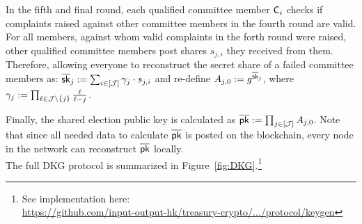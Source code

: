In the fifth and final round, each qualified committee member $\mathsf{C}_i$ checks if complaints raised against other committee members in the fourth round are valid. For all members, against whom valid complaints in the forth round were raised, other qualified committee members post shares $s_{j,i}$ they received from them. Therefore, allowing everyone to reconstruct the secret share of a failed committee members as: $\overline{\mathsf{sk}}_j := \sum_{i\in[\mathcal{J}]} \gamma_{j} \cdot s_{j,i}$ and re-define $A_{j,0}:= g^{\overline{\mathsf{sk}}_j}$, where $\gamma_{j}:= \prod_{\ell\in \mathcal{J}\setminus \{j\} } \frac{\ell}{\ell-j}$. 

Finally, the shared election public key is calculated as $\overline{\mathsf{pk}} := \prod_{j\in[\mathcal{J}]}  A_{j,0}$. Note that since all needed data to calculate $\overline{\mathsf{pk}}$ is posted on the blockchain, every node in the network can reconstruct $\overline{\mathsf{pk}}$ locally.\\

The full DKG protocol is summarized in Figure~\ref{fig:DKG}.\footnote{See implementation here:\\ \href{https://github.com/input-output-hk/treasury-crypto/tree/master/src/main/scala/io/iohk/protocol/keygen}{https://github.com/input-output-hk/treasury-crypto/.../protocol/keygen}}


